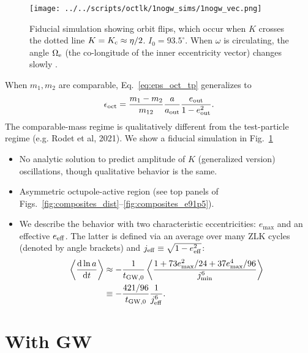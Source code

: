 \documentclass[
        fleqn,
        usenatbib,
    ]{mnras}
\newcommand*{\rd}[2]{\frac{\mathrm{d}#1}{\mathrm{d}#2}}
\newcommand*{\ev}[1]{\left\langle#1\right\rangle}
\newlength{\colummwidth}
\begin{document}
\begin{figure}
    \centering
    \texttt{[image: ../../scripts/octlk/1nogw\_sims/1nogw\_vec.png]}
    \caption{Fiducial simulation showing orbit flips, which occur when $K$
    crosses the dotted line $K = K_{\rm c} \approx \eta / 2$. $I_0 =
    93.5^\circ$. When $\omega$ is circulating, the angle $\Omega_{\rm e}$ (the
    co-longitude of the inner eccentricity vector) changes slowly
    \citep{katz2011long}. }\label{fig:nogw_fiducial}
\end{figure}
When $m_1, m_2$ are comparable, Eq.~\eqref{eq:eps_oct_tp} generalizes to
\begin{equation}
    \epsilon_{\rm oct} = \frac{m_1 - m_2}{m_{12}} \frac{a}{a_{\rm out}}
        \frac{e_{\rm out}}{1 - e_{\rm out}^2}.\label{eq:eps_oct}
\end{equation}
The comparable-mass regime is qualitatively different from the test-particle
regime (e.g. Rodet et al, 2021). We show a fiducial simulation in
Fig.~\ref{fig:nogw_fiducial}

\begin{itemize}
    \item No analytic solution to predict amplitude of $K$ (generalized version)
        oscillations, though qualitative behavior is the same.

    \item Asymmetric octupole-active region (see top panels of
        Figs.~\ref{fig:composites_dist}--\ref{fig:composites_e91p5}).

    \item We describe the behavior with two characteristic eccentricities:
        $e_{\max}$ and an effective $e_{\rm eff}$. The latter is defined via an
        average over many ZLK cycles (denoted by angle brackets) and $j_{\rm
        eff} \equiv \sqrt{1 - e_{\rm eff}^2}$:
        \begin{align}
            \ev{\rd{\ln a}{t}} &\approx -\frac{1}{t_{\rm GW, 0}}
                    \ev{\frac{1 + 73e_{\max}^2/24 + 37e_{\max}^4/96}
                        {j_{\min}^6}}\nonumber\\
                &\equiv -\frac{421/96}{t_{\rm GW, 0}}\frac{1}{j_{\rm eff}^6}.
        \end{align}
\end{itemize}

\section{With GW}\label{s:with_gw}
\end{document}
